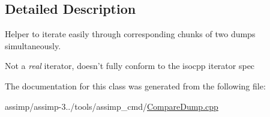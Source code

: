 \subsection{Detailed Description}
Helper to iterate easily through corresponding chunks of two dumps simultaneously. 

Not a {\itshape real} iterator, doesn't fully conform to the isocpp iterator spec 

The documentation for this class was generated from the following file\+:\begin{DoxyCompactItemize}
\item 
assimp/assimp-\/3../tools/assimp\+\_\+cmd/\hyperlink{_compare_dump_8cpp}{Compare\+Dump.\+cpp}\end{DoxyCompactItemize}
